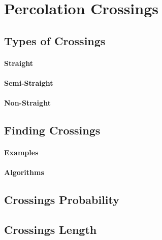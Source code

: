 \section{Percolation Crossings}

\subsection{Types of Crossings}
\paragraph{Straight}
\paragraph{Semi-Straight}
\paragraph{Non-Straight}

\subsection{Finding Crossings}
\paragraph{Examples}
\paragraph{Algorithms}

\subsection{Crossings Probability}

\subsection{Crossings Length}

